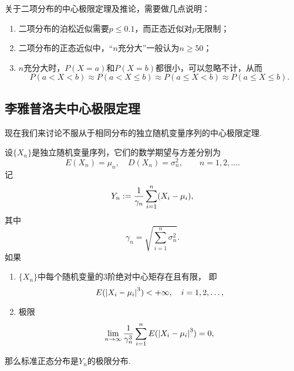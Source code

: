 关于二项分布的中心极限定理及推论，需要做几点说明：
\begin{enumerate}
	\item 二项分布的泊松近似需要\(p \leq 0.1\)，而正态近似对\(p\)无限制；
	\item 二项分布的正态近似中，“\(n\)充分大”一般认为\(n \geq 50\)；
	\item \(n\)充分大时，\(P(X=a)\)和\(P(X=b)\)都很小，可以忽略不计，从而\begin{equation*}
		P(a < X < b)
		\approx P(a < X \leq b)
		\approx P(a \leq X < b)
		\approx P(a \leq X \leq b).
	\end{equation*}
\end{enumerate}

\subsection{李雅普洛夫中心极限定理}
现在我们来讨论不服从于相同分布的独立随机变量序列的中心极限定理.

\begin{theorem}[李雅普洛夫中心极限定理]
设\(\{X_n\}\)是独立随机变量序列，它们的数学期望与方差分别为\begin{equation*}
	E(X_n) = \mu_n, \quad
	D(X_n) = \sigma_n^2,
	\qquad n=1,2,\dotsc.
\end{equation*}
记\begin{equation*}
	Y_n := \frac{1}{\gamma_n} \sum_{i=1}^n (X_i-\mu_i),
\end{equation*}
其中\begin{equation*}
	\gamma_n = \sqrt{\sum_{i=1}^n \sigma_n^2}.
\end{equation*}
如果\begin{enumerate}
	\item \(\{X_n\}\)中每个随机变量的3阶绝对中心矩存在且有限，
	即\begin{equation*}
		E(\abs{X_i-\mu_i}^3) < +\infty,
		\quad i=1,2,\dotsc,
	\end{equation*}

	\item 极限\begin{equation*}
		\lim_{n\to\infty} \frac{1}{\gamma_n^3}
			\sum_{i=1}^n E(\abs{X_i-\mu_i}^3)
		= 0,
	\end{equation*}
\end{enumerate}
那么标准正态分布是\(Y_n\)的极限分布.
\end{theorem}
